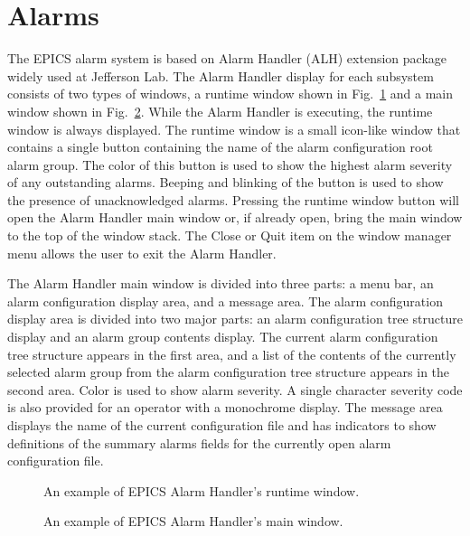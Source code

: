 \documentclass[letter,10pt]{article}
\begin{document}
\section{Alarms}
The EPICS alarm system is based on Alarm Handler (ALH) extension package widely used at Jefferson Lab.
The Alarm Handler display for each subsystem consists of two types of windows, a runtime window shown in 
Fig.~\ref{fig:alarm_runtime} and a main window shown in Fig.~\ref{fig:alarm_main_window}. 
While the Alarm Handler is executing, the runtime window is always displayed. 
The runtime window is a small icon-like window that contains a single button containing the name of the alarm configuration 
root alarm group. The color of this button is used to show the highest alarm severity of any outstanding alarms. Beeping and 
blinking of the button is used to show the presence of unacknowledged alarms. Pressing the runtime window button will open 
the Alarm Handler main window or, if already open, bring the main window to the top of the window stack. The Close or Quit 
item on the window manager menu allows the user to exit the Alarm Handler.

The Alarm Handler main window is divided into three parts: a menu bar, an alarm configuration display area, and a message area.
The alarm configuration display area is divided into two major parts: an alarm configuration tree structure display and an 
alarm group contents display. The current alarm configuration tree structure appears in the first area, and a list of the 
contents of the currently selected alarm group from the alarm configuration tree structure appears in the second area. 
Color is used to show alarm severity. A single character severity code is also provided for an operator with a monochrome display.
The message area displays the name of the current configuration file and has indicators to show definitions of the summary 
alarms fields for the currently open alarm configuration file.

 \begin{figure}
  \centering
  \caption{An example of EPICS Alarm Handler's runtime window.}
  \label{fig:alarm_runtime}
 \end{figure}

 \begin{figure}
  \centering
  \caption{An example of EPICS Alarm Handler's main window.}
  \label{fig:alarm_main_window}
 \end{figure}
\end{document}
